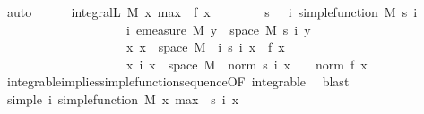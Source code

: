 \begin{isabellebody}
\ auto\isanewline
\ \ \isamarkupfalse%
\ {\isachardoublequoteopen}{}\ {\isasymle}\ integral\isactrlsup L\ M\ {\isacharparenleft}{\kern0pt}{\isasymlambda}x{\isachardot}{\kern0pt}\ max\ {}\ {\isacharparenleft}{\kern0pt}f\ x{\isacharparenright}{\kern0pt}{\isacharparenright}{\kern0pt}{\isachardoublequoteclose}\isanewline
\ \ \isamarkupfalse%
\ {\isacharminus}{\kern0pt}\isanewline
\ \ \isamarkupfalse%
\ s\ \ {\isacharasterisk}{\kern0pt}{\isacharcolon}{\kern0pt}\ {\isachardoublequoteopen}{\isasymAnd}i{\isachardot}{\kern0pt}\ simple{\isacharunderscore}{\kern0pt}function\ M\ {\isacharparenleft}{\kern0pt}s\ i{\isacharparenright}{\kern0pt}{\isachardoublequoteclose}\ \isanewline
\ \ \ \ \ \ \ \ \ \ \ \ \ \ \ \ \ \ \ \ {\isachardoublequoteopen}{\isasymAnd}i{\isachardot}{\kern0pt}\ emeasure\ M\ {\isacharbraceleft}{\kern0pt}y\ {\isasymin}\ space\ M{\isachardot}{\kern0pt}\ s\ i\ y\ {\isasymnoteq}\ {}{\isacharbraceright}{\kern0pt}\ {\isasymnoteq}\ {\isasyminfinity}{\isachardoublequoteclose}\ \isanewline
\ \ \ \ \ \ \ \ \ \ \ \ \ \ \ \ \ \ \ \ {\isachardoublequoteopen}{\isasymAnd}x{\isachardot}{\kern0pt}\ x\ {\isasymin}\ space\ M\ {\isasymLongrightarrow}\ {\isacharparenleft}{\kern0pt}{\isasymlambda}i{\isachardot}{\kern0pt}\ s\ i\ x{\isacharparenright}{\kern0pt}\ {\isasymlonglonglongrightarrow}\ f\ x{\isachardoublequoteclose}\ \isanewline
\ \ \ \ \ \ \ \ \ \ \ \ \ \ \ \ \ \ \ \ {\isachardoublequoteopen}{\isasymAnd}x\ i{\isachardot}{\kern0pt}\ x\ {\isasymin}\ space\ M\ {\isasymLongrightarrow}\ norm\ {\isacharparenleft}{\kern0pt}s\ i\ x{\isacharparenright}{\kern0pt}\ {\isasymle}\ {}\ {\isacharasterisk}{\kern0pt}\ norm\ {\isacharparenleft}{\kern0pt}f\ x{\isacharparenright}{\kern0pt}{\isachardoublequoteclose}\ \isamarkupfalse%
\ integrable{\isacharunderscore}{\kern0pt}implies{\isacharunderscore}{\kern0pt}simple{\isacharunderscore}{\kern0pt}function{\isacharunderscore}{\kern0pt}sequence{\isacharbrackleft}{\kern0pt}OF\ integrable{\isacharbrackright}{\kern0pt}\ \isamarkupfalse%
\ blast\isanewline
\ \ \ \ \isamarkupfalse%
\ simple{\isacharcolon}{\kern0pt}\ {\isachardoublequoteopen}{\isasymAnd}i{\isachardot}{\kern0pt}\ simple{\isacharunderscore}{\kern0pt}function\ M\ {\isacharparenleft}{\kern0pt}{\isasymlambda}x{\isachardot}{\kern0pt}\ max\ {}\ {\isacharparenleft}{\kern0pt}s\ i\ x{\isacharparenright}{\kern0pt}{\isacharparenright}{\kern0pt}{\isachardoublequoteclose}\ \isamarkupfalse%

\end{isabellebody}
